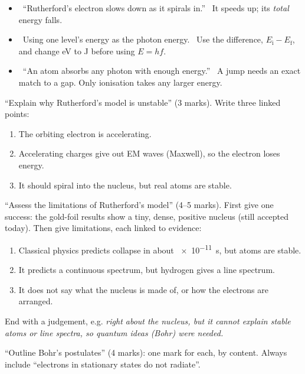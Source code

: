 \begin{mistakes}
\begin{itemize}
  \item \xmark\ ``Rutherford's electron slows down as it spirals in.'' \cmark\ It speeds up;
        its \emph{total} energy falls.
  \item \xmark\ Using one level's energy as the photon energy. \cmark\ Use the difference,
        $E_\mathrm{i} - E_\mathrm{f}$, and change eV to J before using $E = hf$.
  \item \xmark\ ``An atom absorbs any photon with enough energy.'' \cmark\ A jump needs an
        exact match to a gap. Only ionisation takes any larger energy.
\end{itemize}
\end{mistakes}

\begin{examtip}
``Explain why Rutherford's model is unstable'' (3 marks). Write three linked points:
\begin{enumerate}
  \item The orbiting electron is accelerating.
  \item Accelerating charges give out EM waves (Maxwell), so the electron loses energy.
  \item It should spiral into the nucleus, but real atoms are stable.
\end{enumerate}
``Assess the limitations of Rutherford's model'' (4--5 marks). First give one success: the
gold-foil results show a tiny, dense, positive nucleus (still accepted today). Then give
limitations, each linked to evidence:
\begin{enumerate}
  \item Classical physics predicts collapse in about \qty{e-11}{s}, but atoms are stable.
  \item It predicts a continuous spectrum, but hydrogen gives a line spectrum.
  \item It does not say what the nucleus is made of, or how the electrons are arranged.
\end{enumerate}
End with a judgement, e.g. \emph{right about the nucleus, but it cannot explain stable atoms
or line spectra, so quantum ideas (Bohr) were needed.}

``Outline Bohr's postulates'' (4 marks): one mark for each, by content. Always include
``electrons in stationary states do not radiate''.
\end{examtip}


